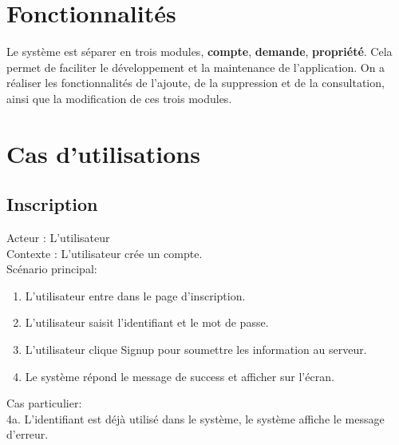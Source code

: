\documentclass[14px]{article}
\begin{document}
\begin{figure}
\end{figure}


\section{Fonctionnalités}
Le système est séparer en trois modules, \textbf{compte}, \textbf{demande}, \textbf{propriété}. Cela permet de faciliter le développement et la maintenance de l'application. On a réaliser les fonctionnalités de l'ajoute, de la suppression et de la consultation, ainsi que la modification de ces trois modules.

\section{Cas d'utilisations}
\subsection{Inscription}
Acteur : L'utilisateur\\
Contexte : L'utilisateur crée un compte.\\
Scénario principal:
\begin{enumerate}
	\item L'utilisateur entre dans le page d'inscription.
	\item L'utilisateur saisit l'identifiant et le mot de passe.
	\item L'utilisateur clique Signup pour soumettre les information au serveur.
	\item Le système répond le message de success et afficher sur l'écran.
\end{enumerate}
Cas particulier:\\
4a. L'identifiant est déjà utilisé dans le système, le système affiche le message d'erreur.
\end{document}
